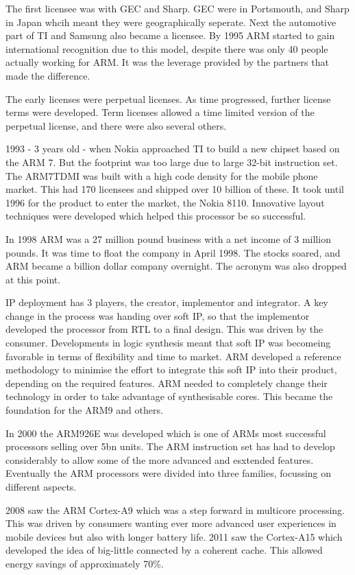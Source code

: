 \documentclass{elec6049Report}     %
\begin{document}
The first licensee was with GEC and Sharp. GEC were in Portsmouth, and Sharp in Japan whcih meant they were geographically seperate. Next the automotive part of TI and Samsung also became a licensee. By 1995 ARM started to gain international recognition due to this model, despite there was only 40 people actually working for ARM. It was the leverage provided by the partners that made the difference.

The early licenses were perpetual licenses. As time progressed, further license terms were developed. Term licenses allowed a time limited version of the perpetual license, and there were also several others. 

1993 - 3 years old - when Nokia approached TI to build a new chipset based on the ARM 7. But the footprint was too large due to large 32-bit instruction set. The ARM7TDMI was built with a high code density for the mobile phone market. This had 170 licensees and shipped over 10 billion of these. It took until 1996 for the product to enter the market, the Nokia 8110. Innovative layout techniques were developed which helped this processor be so successful.

In 1998 ARM was a 27 million pound business with a net income of 3 million pounds. It was time to float the company in April 1998. The stocks soared, and ARM became a billion dollar company overnight. The acronym was also dropped at this point.

IP deployment has 3 players, the creator, implementor and integrator. A key change in the process was handing over soft IP, so that the implementor developed the processor from RTL to a final design. This was driven by the consumer. Developments in logic synthesis meant that soft IP was becomeing favorable in terms of flexibility and time to market. ARM developed a reference methodology to minimise the effort to integrate this soft IP into their product, depending on the required features. ARM needed to completely change their technology in order to take advantage of synthesisable cores. This became the foundation for the ARM9 and others.

In 2000 the ARM926E was developed which is one of ARMs most successful processors selling over 5bn units. The ARM instruction set has had to develop considerably to allow some of the more advanced and esxtended features. Eventually the ARM processors were divided into three families, focussing on different aspects.

2008 saw the ARM Cortex-A9 which was a step forward in multicore processing. This was driven by consumers wanting ever more advanced user experiences in mobile devices but also with longer battery life. 2011 saw the Cortex-A15 which developed the idea of big-little connected by a coherent cache. This allowed energy savings of approximately 70\%. 
\end{document}
